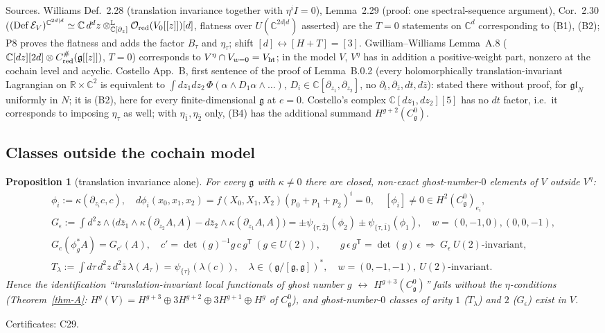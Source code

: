 \documentclass[10pt,a4paper]{article}
\numberwithin{equation}{section}
\newtheorem{proposition}[theorem]{Proposition}
\theoremstyle{definition}
\theoremstyle{remark}
\newcommand{\g}{\mathfrak g}
\newcommand{\fgl}{\mathfrak{gl}}
\newcommand{\zb}{\bar z}
\newcommand{\Vht}{V_{\rm ht}}
\newcommand{\Veta}{V^{\eta}}
\newcommand{\Cg}{C^0_{\g}}
\newcommand{\cert}[1]{\par\noindent\textup{Certificates: #1.}\par}
\begin{document}
Sources. Williams \cite{Wil} Def.~2.28 (translation invariance together with $\eta^iI=0$), Lemma~2.29 (proof: one spectral-sequence argument), Cor.~2.30 ($(\mathrm{Def}\,\mathcal E_V)^{\mathbb C^{2d|d}}\simeq\mathbb C\,d^dz\otimes^{\mathbb L}_{\mathbb C[\partial_z]}\mathcal O_{\rm red}(V_0[[z]])[d]$, flatness over $U(\mathbb C^{2d|d})$ asserted) are the $T=0$ statements on $\mathbb C^d$ corresponding to (B1), (B2); P8 proves the flatness and adds the factor $B_\tau$ and $\eta_\tau$; shift $[d]\leftrightarrow[H+T]=[3]$. Gwilliam--Williams \cite{GW18} Lemma~A.8 ($\mathbb C[dz][2d]\otimes C^\#_{\rm red}(\g[[z]])$, $T=0$) corresponds to $\Veta\cap V_{w=0}=\Vht$; in the model $V$, $\Veta$ has in addition a positive-weight part, nonzero at the cochain level and acyclic. Costello \cite{C16} App.~B, first sentence of the proof of Lemma~B.0.2 (every holomorphically translation-invariant Lagrangian on $\mathbb R\times\mathbb C^2$ is equivalent to $\int dz_1dz_2\,\Phi(\alpha\wedge D_1\alpha\wedge\dots)$, $D_i\in\mathbb C[\partial_{z_1},\partial_{z_2}]$, no $\partial_t,\partial_{\zb},dt,d\zb$): stated there without proof, for $\fgl_N$ uniformly in $N$; it is (B2), here for every finite-dimensional $\g$ at $e=0$. Costello's complex $\mathbb C[dz_1,dz_2][5]$ has no $dt$ factor, i.e.\ it corresponds to imposing $\eta_\tau$ as well; with $\eta_{\bar1},\eta_{\bar2}$ only, (B4) has the additional summand $H^{g+2}(\Cg)$.

\subsection{Classes outside the cochain model}

\begin{proposition}[translation invariance alone]\label{prop-HCEfalse}
For every $\g$ with $\kappa\neq0$ there are closed, non-exact ghost-number-$0$ elements of $V$ outside $\Veta$:
\begin{gather}
\phi_i:=\kappa(\partial_{z_i}c,c),\quad d\phi_i(x_0,x_1,x_2)=f(X_0,X_1,X_2)(p_0+p_1+p_2)^i=0,\quad [\phi_i]\neq0\in H^2(\Cg)_{e_i},\\
G_\epsilon:=\int d^2z\wedge\big(d\zb_1\wedge\kappa(\partial_{z_2}A,A)-d\zb_2\wedge\kappa(\partial_{z_1}A,A)\big)=\pm\psi_{\{\tau,\bar2\}}(\phi_2)\pm\psi_{\{\tau,\bar1\}}(\phi_1),\quad w=(0,-1,0),(0,0,-1),\\
G_c(\phi_g^*A)=G_{c'}(A),\quad c'=\det(g)^{-1}g\,c\,g^{\mathsf T}\ (g\in U(2)),\qquad g\,\epsilon\,g^{\mathsf T}=\det(g)\,\epsilon\ \Rightarrow\ G_\epsilon\ U(2)\text{-invariant},\\
T_\lambda:=\int d\tau\,d^2z\,d^2\zb\,\lambda(A_\tau)=\psi_{\{\tau\}}(\lambda(c)),\quad \lambda\in(\g/[\g,\g])^*,\quad w=(0,-1,-1),\ U(2)\text{-invariant}.
\end{gather}
Hence the identification ``translation-invariant local functionals of ghost number $g$ $\leftrightarrow$ $H^{g+3}(\Cg)$'' fails without the $\eta$-conditions (Theorem~\ref{thm-A}: $H^g(V)=H^{g+3}\oplus3H^{g+2}\oplus3H^{g+1}\oplus H^g$ of $\Cg$), and ghost-number-$0$ classes of arity $1$ ($T_\lambda$) and $2$ ($G_\epsilon$) exist in $V$.
\end{proposition}
\cert{C29}
\end{document}
